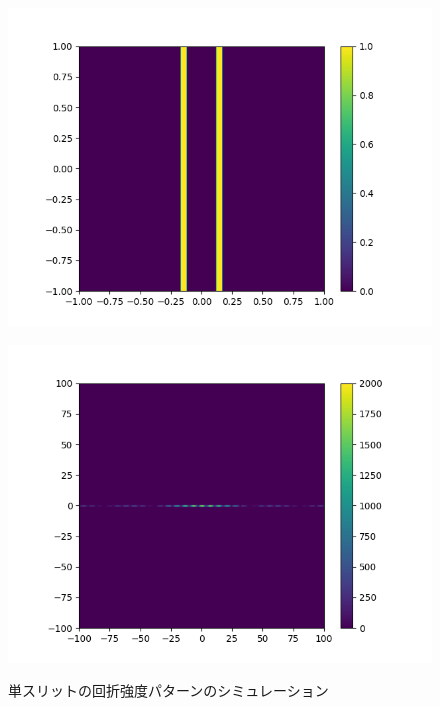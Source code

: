 \begin{figure}[htbp]
\begin{minipage}[ht]{0.48\hsize}
		\includegraphics[width=\linewidth]{src/figures/result/ds3_original_estimation.png}
		\label{subfig:amplitude_sim_dual3_original}
	\end{minipage}
	\begin{minipage}[ht]{0.48\hsize}\centering
		\includegraphics[width=\linewidth]{src/figures/result/ds3_amplitude_estimation.png}
		\label{subfig:amplitude_sim_dual3}
	\end{minipage}
	\caption{単スリットの回折強度パターンのシミュレーション}\label{fig:amplitude_sim_dual}
\end{figure}
